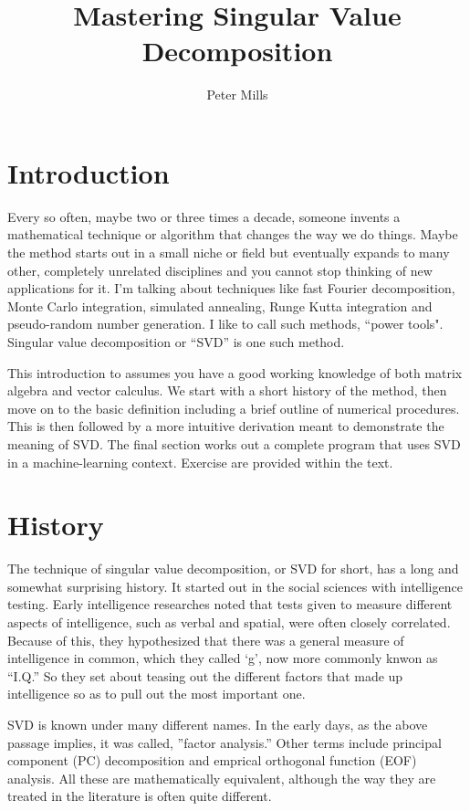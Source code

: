 \documentclass{article}
\begin{document}
\title{Mastering Singular Value Decomposition}

\author{Peter Mills}

\maketitle

\section{Introduction}

Every so often, maybe two or three times a decade, someone invents a 
mathematical technique or algorithm that changes the way we do things.
Maybe the method starts out in a small niche or field but eventually expands
to many other, completely unrelated disciplines and you cannot stop thinking
of new applications for it.
I'm talking about techniques like fast Fourier decomposition,
Monte Carlo integration, simulated annealing, Runge Kutta integration
and pseudo-random number generation.
I like to call such methods, ``power tools".
Singular value decomposition or ``SVD'' is one such method.

This introduction to assumes you have a good working knowledge of 
both matrix algebra and vector calculus.
We start with a short history of the method, then move on to the basic 
definition including a brief outline of numerical procedures.
This is then followed by a more intuitive derivation meant to demonstrate
the meaning of SVD.
The final section works out a complete program that uses SVD in a machine-learning
context.
Exercise are provided within the text.

\section{History}

The technique of singular value decomposition, or SVD for short, has a long
and somewhat surprising history.
It started out in the social sciences with intelligence testing.
Early intelligence researches noted that tests given to measure different
aspects of intelligence, such as verbal and spatial, were often closely
correlated.
Because of this, they hypothesized that there was a general measure of 
intelligence in common, which they called `g', now more commonly knwon
as ``I.Q.''
So they set about teasing out the different factors that made up intelligence
so as to pull out the most important one.

SVD is known under many different names.
In the early days, as the above passage implies, it was called, ''factor
analysis.''
Other terms include principal component (PC) decomposition and 
emprical orthogonal function (EOF) analysis.
All these are mathematically equivalent, although the way they are treated
in the literature is often quite different.
\end{document}
